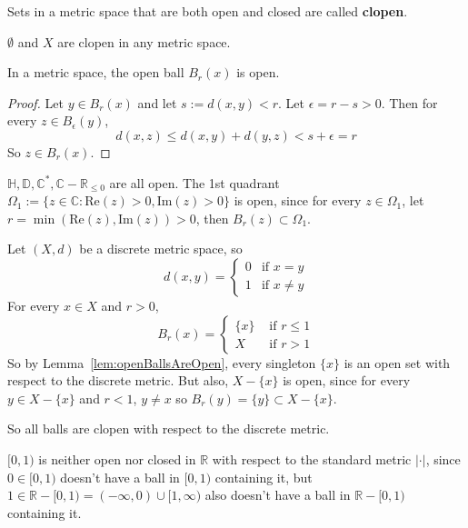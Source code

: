 \begin{definition}
	Sets in a metric space that are both open and closed are called \textbf{clopen}.
\end{definition}

\begin{example}
	$\emptyset$ and $X$ are clopen in any metric space.
\end{example}

\begin{lemma}\label{lem:openBallsAreOpen}
	In a metric space, the open ball $B_r(x)$ is open.
\end{lemma}

\begin{proof}
	Let $y \in B_r(x)$ and let $s := d(x, y) < r$. Let $\epsilon = r - s > 0$. Then for every $z \in B_{\epsilon}(y)$,
	\[
		d(x, z) \le d(x, y) + d(y, z) < s + \epsilon = r
	\]
	So $z \in B_r(x)$.
\end{proof}

\begin{example}
	$\mathbb{H}, \mathbb{D}, \mathbb{C}^*, \mathbb{C} - \mathbb{R}_{\le 0}$ are all open. The 1st quadrant $\Omega_1 := \{ z \in \mathbb{C}: \text{Re}(z) > 0, \text{Im}(z) > 0 \}$ is open, since for every $z \in \Omega_1$, let $r = \min( \text{Re}(z), \text{Im}(z) ) > 0$, then $B_r(z) \subset \Omega_1$.
\end{example}

\begin{example}
	Let $(X, d)$ be a discrete metric space, so
	\[
		d(x, y) = \begin{cases}
			0 & \text{if } x = y \\
			1 & \text{if } x \ne y
		\end{cases}
	\]
	For every $x \in X$ and $r > 0$,
	\[
		B_r(x) = \begin{cases}
			\{x\} & \text{ if } r \le 1 \\
			X & \text{ if } r > 1
		\end{cases}
	\]
	So by Lemma~\ref{lem:openBallsAreOpen}, every singleton $\{ x \}$ is an open set with respect to the discrete metric. But also, $X - \{ x \}$ is open, since for every $y \in X - \{ x \}$ and $r < 1$, $y \ne x$ so $B_r(y) = \{ y \} \subset X - \{ x \}$.

	So all balls are clopen with respect to the discrete metric.
\end{example}

\begin{example}
	$[0, 1)$ is neither open nor closed in $\mathbb{R}$ with respect to the standard metric $|\cdot|$, since $0 \in [0, 1)$ doesn't have a ball in $[0, 1)$ containing it, but $1 \in \mathbb{R} - [0, 1) = (-\infty, 0) \cup [1, \infty)$ also doesn't have a ball in $\mathbb{R} - [0, 1)$ containing it.
\end{example}

